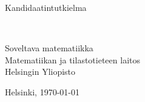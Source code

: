 \begin{titlepage}
    \begin{center}
        {\large Kandidaatintutkielma}

        \vspace{\baselineskip}

        {\Large \bfseries \Title}

        \vspace{2\baselineskip}

        {\large \Author}\\


        \vfill

        {\large
            Soveltava matematiikka\\
            Matematiikan ja tilastotieteen laitos\\
            Helsingin Yliopisto
        }

        \vspace{2\baselineskip}

        {\large Helsinki, \today}
    \end{center}
\end{titlepage}
